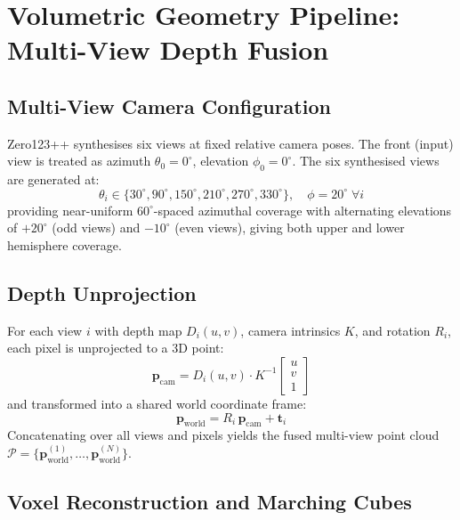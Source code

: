 \documentclass[conference]{IEEEtran}
\begin{document}
\section{Volumetric Geometry Pipeline: Multi-View Depth Fusion}

\subsection{Multi-View Camera Configuration}

Zero123++ synthesises six views at fixed relative camera poses. The front (input) view is treated as azimuth
$\theta_0 = 0^\circ$, elevation $\phi_0 = 0^\circ$. The six synthesised views are generated at:
\begin{equation}
\theta_i \in \{30^\circ, 90^\circ, 150^\circ, 210^\circ, 270^\circ, 330^\circ\}, \quad \phi = 20^\circ \; \forall i
\label{eq:azimuths}
\end{equation}
providing near-uniform $60^\circ$-spaced azimuthal coverage with alternating elevations of $+20^\circ$ (odd views) and $-10^\circ$ (even views), giving both upper and lower hemisphere coverage.

\subsection{Depth Unprojection}

For each view $i$ with depth map $D_i(u, v)$, camera intrinsics $K$, and rotation $R_i$, each pixel is
unprojected to a 3D point:
\begin{equation}
\mathbf{p}_{\text{cam}} = D_i(u,v) \cdot K^{-1} \begin{bmatrix} u \\ v \\ 1 \end{bmatrix}
\label{eq:unproject}
\end{equation}
and transformed into a shared world coordinate frame:
\begin{equation}
\mathbf{p}_{\text{world}} = R_i \, \mathbf{p}_{\text{cam}} + \mathbf{t}_i
\label{eq:world}
\end{equation}
Concatenating over all views and pixels yields the fused multi-view point cloud
$\mathcal{P} = \{\mathbf{p}^{(1)}_{\text{world}}, \ldots, \mathbf{p}^{(N)}_{\text{world}}\}$.

\subsection{Voxel Reconstruction and Marching Cubes}
\end{document}
